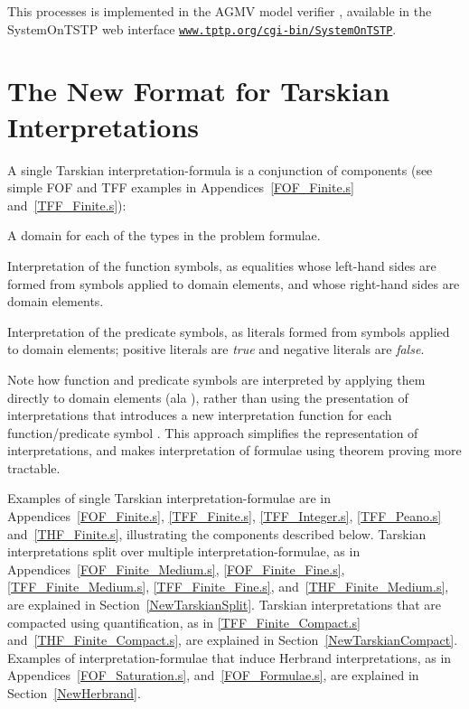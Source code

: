 \documentclass{easychair}
\newenvironment{packed_itemize}{
\vspace*{-0.3em}
\begin{itemize}
\setlength{\partopsep}{0pt}
\setlength{\itemsep}{1pt}
\setlength{\parskip}{0pt}
\setlength{\parsep}{0pt}
}{\end{itemize}}
\begin{document}
This processes is implemented in the AGMV model verifier \cite{SS+23-LPAR}, available in the
SystemOnTSTP \cite{Sut07-CSR} web interface
\href{https://www.tptp.org/cgi-bin/SystemOnTSTP}{{\tt www.tptp.org/cgi-bin/SystemOnTSTP}}.
      
\section{The New Format for Tarskian Interpretations}
\label{NewTarskian}

A single Tarskian interpretation-formula is a conjunction of components (see simple FOF and TFF
examples in Appendices~\ref{FOF_Finite.s} and~\ref{TFF_Finite.s}):
\begin{packed_itemize}
\item A domain for each of the types in the problem formulae.
\item Interpretation of the function symbols, as equalities whose left-hand sides are formed from 
      symbols applied to domain elements, and whose right-hand sides are domain elements.
\item Interpretation of the predicate symbols, as literals formed from symbols applied
      to domain elements; positive literals are {\em true} and negative literals are {\em false}.
\end{packed_itemize}

Note how function and predicate symbols are interpreted by applying them directly to domain
elements (ala \cite[\S5.3.4]{Gal15}), rather than using the presentation of interpretations
that introduces a new interpretation function for each function/predicate symbol 
\cite[\S5.3.2]{Gal15}.
This approach simplifies the representation of interpretations, and makes interpretation of 
formulae using theorem proving more tractable.

Examples of single Tarskian interpretation-formulae are in Appendices~\ref{FOF_Finite.s}, 
\ref{TFF_Finite.s}, \ref{TFF_Integer.s}, \ref{TFF_Peano.s} and~\ref{THF_Finite.s}, illustrating 
the components described below. 
Tarskian interpretations split over multiple interpretation-formulae, as in 
Appendices~\ref{FOF_Finite_Medium.s}, \ref{FOF_Finite_Fine.s}, \ref{TFF_Finite_Medium.s}, 
\ref{TFF_Finite_Fine.s}, and~\ref{THF_Finite_Medium.s}, are explained in 
Section~\ref{NewTarskianSplit}.
Tarskian interpretations that are compacted using quantification, as in \ref{TFF_Finite_Compact.s}
and~\ref{THF_Finite_Compact.s}, are explained in Section~\ref{NewTarskianCompact}.
Examples of interpretation-formulae that induce Herbrand interpretations, as in 
Appendices~\ref{FOF_Saturation.s}, and~\ref{FOF_Formulae.s}, are explained in 
Section~\ref{NewHerbrand}.
\end{document}
